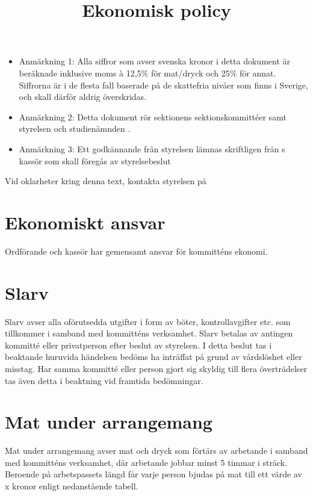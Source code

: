 \documentclass[11pt, includeaddress]{classes/cthit}
\begin{document}
\title{Ekonomisk policy}
\maketitle

\thispagestyle{empty}

\newpage

\makeheadfoot%

\setcounter{tocdepth}{2}
\setcounter{page}{1}
\tableofcontents

\newpage

\begin{itemize}
	\item Anmärkning 1: Alla siffror som avser svenska kronor i detta dokument är beräknade inklusive moms à 12,5\% för mat/dryck och 25\% för annat. Siffrorna är i de flesta fall baserade på de skattefria nivåer som finns i Sverige, och skall därför aldrig överskridas.
	\item Anmärkning 2: Detta dokument rör sektionens sektionskommittéer samt styrelsen \STYRIT och studienämnden \SNIT. 
	\item Anmärkning 3: Ett godkännande från styrelsen lämnas skriftligen från \STYRIT{}s kassör som skall föregås av styrelsebeslut
\end{itemize}

Vid oklarheter kring denna text, kontakta styrelsen på 


\section{Ekonomiskt ansvar}
Ordförande och kassör har gemensamt ansvar för kommitténs ekonomi.


\section{Slarv}
Slarv avser alla oförutsedda utgifter i form av böter, kontrollavgifter etc. som tillkommer i samband med kommitténs verksamhet. Slarv betalas av antingen kommitté eller privatperson efter beslut av styrelsen. I detta beslut tas i beaktande huruvida händelsen bedöms ha inträffat på grund av vårdslöshet eller misstag. Har samma kommitté eller person gjort sig skyldig till flera överträdelser tas även detta i beaktning vid framtida bedömningar.


\section{Mat under arrangemang}
Mat under arrangemang avser mat och dryck som förtärs av arbetande i samband med kommitténs verksamhet, där arbetande jobbar minst 5 timmar i sträck. Beroende på arbetspassets längd får varje person bjudas på mat till ett värde av x kronor enligt nedanstående tabell.
\end{document}
